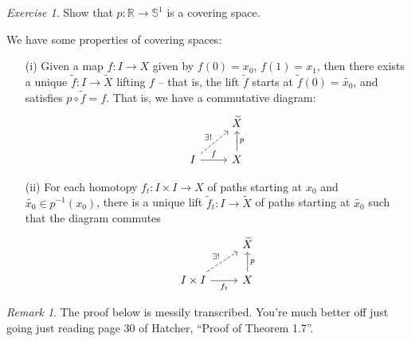 \documentclass[a4paper]{report}
\theoremstyle{definition}
\theoremstyle{remark}
\newtheorem{remark}{Remark}
\theoremstyle{proposition}
\theoremstyle{conjecture}
\theoremstyle{lemma}
\theoremstyle{corollary}
\theoremstyle{exercise}
\newtheorem{exercise}{Exercise}
\begin{document}
\begin{exercise}
    Show that $p : \mathbb{R} \to \mathbb{S}^1$ is a covering space.
\end{exercise}

We have some properties of covering spaces:
\begin{itemize}
    \item[(i)]
        Given a map $f : I \to X$ given by 
        $f(0) = x_0$, $f(1) = x_1$, then there 
        exists a unique $\widetilde{f} : I \to \widetilde{X}$ lifting $f$ -- that is, the lift $\widetilde{f}$ starts at 
        $\widetilde{f}(0) = \widetilde{x_0}$, and satisfies $p\circ \widetilde{f} = f$. That is, we have a commutative diagram:
        $$\begin{tikzcd}
                                                 & \widetilde{X}     \\
I \arrow[r, "f"] \arrow[ru, "\exists !", dashed] & X \arrow[u, "p"']
\end{tikzcd}$$
    \item[(ii)] For each homotopy $f_t : I \times I \to X$ of paths 
        starting at $x_0$ and $\widetilde{x_0} \in p^{-1}(x_0)$, there is a unique 
        lift $\widetilde{f}_t : I \to \widetilde{X}$ of paths starting at 
        $\widetilde{x_0}$ such that the diagram commutes  $$\begin{tikzcd}
                                                           & \widetilde{X}     \\
I \times I \arrow[r, "f_t"'] \arrow[ru, "\exists !", dashed] & X \arrow[u, "p"']
\end{tikzcd}$$
\end{itemize}

\begin{remark}
    The proof below is messily transcribed. You're much  better off just 
    going just reading page 30 of Hatcher, ``Proof of Theorem 1.7''.
\end{remark}
\end{document}
